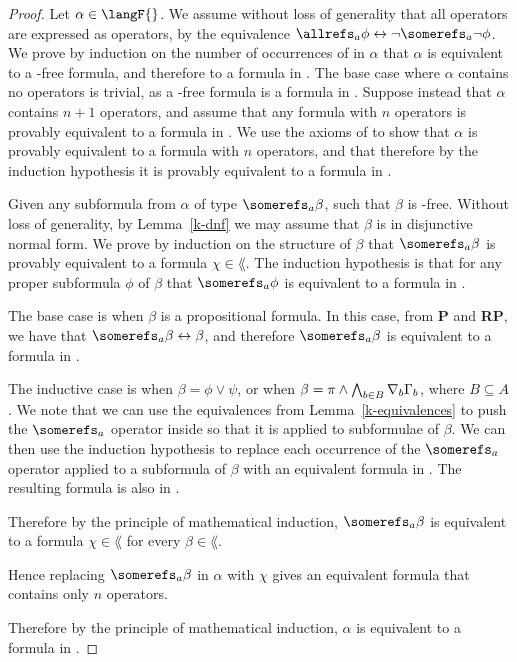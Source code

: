\begin{proof}
Let $\alpha \in \langF{}$. We assume without loss of generality that all
\allrefs{} operators are expressed as \somerefs{} operators, by the equivalence
$\allrefs_a \phi \iff \neg \somerefs_a \neg \phi$. We prove by induction on the
number of occurrences of \somerefs{} in $\alpha$ that $\alpha$ is equivalent to
a \somerefs{}-free formula, and therefore to a formula in \lang{}. The base
case where $\alpha$ contains no \somerefs{} operators is trivial, as a
\somerefs{}-free formula is a formula in \lang{}. Suppose instead that $\alpha$
contains $n + 1$ \somerefs{} operators, and assume that any formula with $n$
\somerefs{} operators is provably equivalent to a formula in \lang{}. We use
the axioms of \axiomKF{} to show that $\alpha$ is provably equivalent to a
formula with $n$ \somerefs{} operators, and that therefore by the induction
hypothesis it is provably equivalent to a formula in \lang{}.

Given any subformula from $\alpha$ of type $\somerefs_a \beta$, such that $\beta$ is
\somerefs{}-free. Without loss of generality, by Lemma~\ref{k-dnf} we may assume
that $\beta$ is in disjunctive normal form. We prove by induction on the
structure of $\beta$ that $\somerefs_a \beta$ is provably equivalent to a
formula $\chi \in \lang$. The induction hypothesis is that for any proper
subformula $\phi$ of $\beta$ that $\somerefs_a \phi$ is equivalent to a formula
in \lang{}.

The base case is when $\beta$ is a propositional formula. In this case, from
{\bf P} and {\bf RP}, we have that $\somerefs_a \beta \iff \beta$, and therefore
$\somerefs_a \beta$ is equivalent to a formula in \lang{}. 

The inductive case is when $\beta = \phi \lor \psi$, or when $\beta = \pi \land
\bigwedge_{b \in B} \nabla_b \Gamma_b$, where $B \subseteq A$. We note that we
can use the equivalences from Lemma~\ref{k-equivalences} to push the $\somerefs_a$
operator inside so that it is applied to subformulae of $\beta$. We can then use
the induction hypothesis to replace each occurrence of the $\somerefs_a$
operator applied to a subformula of $\beta$ with an equivalent formula in
\lang{}. The resulting formula is also in \lang{}.

Therefore by the principle of mathematical induction, $\somerefs_a \beta$ is
equivalent to a formula $\chi \in \lang{}$ for every $\beta \in \lang{}$. 

Hence replacing $\somerefs_a \beta$ in $\alpha$ with $\chi$ gives an equivalent
formula that contains only $n$ \somerefs{} operators.

Therefore by the principle of mathematical induction, $\alpha$ is equivalent to
a formula in \lang{}.
\end{proof}


